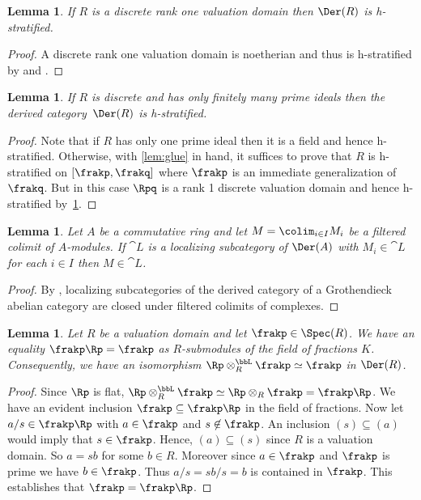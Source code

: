 \documentclass{amsart}
\numberwithin{equation}{section}%
\newtheorem{Lem}[equation]{Lemma}
\theoremstyle{remark}
\begin{document}
\begin{Lem}\label{lem:discrete-rank-one}
	If $R$ is a discrete rank one valuation domain then $\Der(R)$ is h-stratified.
\end{Lem}

\begin{proof}
	A discrete rank one valuation domain is noetherian and thus is h-stratified by \cite{Neeman92a} and \cite[Theorem 9.6]{BarthelHeardSandersZou26}.
\end{proof}

\begin{Lem}\label{lem:discrete-finite}
	If $R$ is discrete and has only finitely many prime ideals then the derived category~$\Der(R)$ is h-stratified.
\end{Lem}

\begin{proof}
	Note that if $R$ has only one prime ideal then it is a field and hence h-stratified. Otherwise, with \cref{lem:glue} in hand, it suffices to prove that $R$ is h-stratified on $[\frakp,\frakq]$ where $\frakp$ is an immediate generalization of $\frakq$. But in this case $\Rpq$ is a rank 1 discrete valuation domain and hence h-stratified by~\cref{lem:discrete-rank-one}.
\end{proof}

\begin{Lem}\label{lem:hocolim}
	Let $A$ be a commutative ring and let $M=\colim_{i \in I} M_i$ be a filtered colimit of $A$-modules. If $\cat L$ is a localizing subcategory of $\Der(A)$ with $M_i \in \cat L$ for each $i \in I$ then $M \in \cat L$.
\end{Lem}

\begin{proof}
    By \cite[Theorems~2.2 and 3.1]{AlonsoJeremiasSouto00}, localizing subcategories of the derived category of a Grothendieck abelian category are closed under filtered colimits of complexes.
\end{proof}

\begin{Lem}\label{lem:Rp-tensor-p}
	Let $R$ be a valuation domain and let $\frakp \in \Spec(R)$. We have an equality $\frakp\Rp =\frakp$ as $R$-submodules of the field of fractions $K$. Consequently, we have an isomorphism $\Rp \otimes_R^{\bbL} \frakp \simeq \frakp$ in $\Der(R)$.
\end{Lem}

\begin{proof}
	Since $\Rp$ is flat, $\Rp\otimes_R^{\bbL} \frakp \simeq \Rp\otimes_R \frakp = \frakp \Rp$. We have an evident inclusion $\frakp \subseteq \frakp\Rp$ in the field of fractions. Now let $a/s \in \frakp \Rp$ with $a \in \frakp$ and $s\not\in \frakp$. An inclusion $(s) \subseteq (a)$ would imply that $s \in \frakp$. Hence, $(a) \subseteq (s)$ since $R$ is a valuation domain. So $a = sb$ for some $b \in R$. Moreover since $a \in \frakp$ and $\frakp$ is prime we have $b \in \frakp$. Thus $a/s = sb/s = b$ is contained in $\frakp$. This establishes that $\frakp = \frakp \Rp$.
\end{proof}
\end{document}
